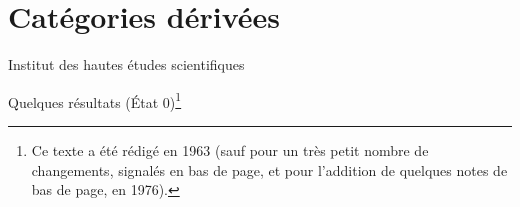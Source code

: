 
\chapter{Catégories dérivées}\label{VIII}
\begin{center}Institut des hautes études scientifiques\end{center}
Quelques résultats (État 0)\footnote{Ce texte a été rédigé en 1963 (sauf pour un très petit nombre de changements, signalés en bas de page, et pour l'addition de quelques notes de bas de page, en 1976).}










